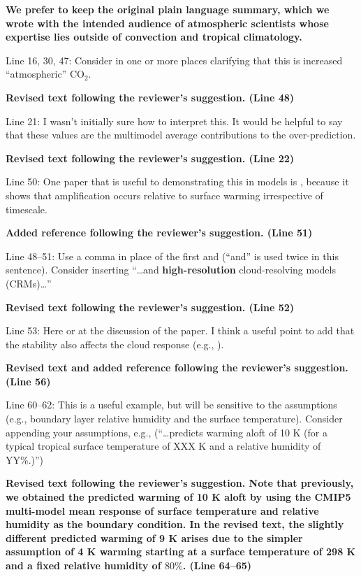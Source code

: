 \documentclass[11pt]{article}
\begin{document}
\textbf{We prefer to keep the original plain language summary, which we wrote with the intended audience of atmospheric scientists whose expertise lies outside of convection and tropical climatology.}

Line 16, 30, 47: Consider in one or more places clarifying that this is increased ``atmospheric'' CO\(_2\).

\textbf{Revised text following the reviewer's suggestion. (Line 48)}

Line 21: I wasn't initially sure how to interpret this. It would be helpful to say that these values are the multimodel average contributions to the over-prediction.

\textbf{Revised text following the reviewer's suggestion. (Line 22)}

Line 50: One paper that is useful to demonstrating this in models is \cite{santer_amplification_2005}, because it shows that amplification occurs relative to surface warming irrespective of timescale.

\textbf{Added reference following the reviewer's suggestion. (Line 51)}

Line 48--51: Use a comma in place of the first and (``and'' is used twice in this sentence). Consider inserting ``\ldots{}and \textbf{high-resolution} cloud-resolving models (CRMs)\ldots{}''

\textbf{Revised text following the reviewer's suggestion. (Line 52)}

Line 53: Here or at the discussion of the \cite{andrews_dependence_2018} paper. I think a useful point to add that the stability also affects the cloud response (e.g., \cite{zhou_impact_2016}).

\textbf{Revised text and added reference following the reviewer's suggestion. (Line 56)}

Line 60--62: This is a useful example, but will be sensitive to the assumptions (e.g., boundary layer relative humidity and the surface temperature). Consider appending your assumptions, e.g., (``\ldots{}predicts warming aloft of 10 K (for a typical tropical surface temperature of XXX K and a relative humidity of YY\%.)'')

\textbf{Revised text following the reviewer's suggestion. Note that previously, we obtained the predicted warming of 10 K aloft by using the CMIP5 multi-model mean response of surface temperature and relative humidity as the boundary condition. In the revised text, the slightly different predicted warming of 9 K arises due to the simpler assumption of 4 K warming starting at a surface temperature of 298 K and a fixed relative humidity of \(80\%\). (Line 64--65)}
\end{document}
